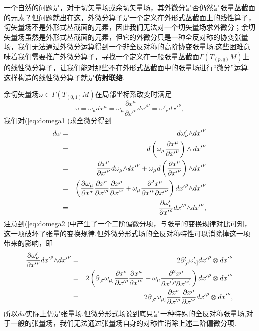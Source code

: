 		一个自然的问题是，对于切矢量场或余切矢量场，其外微分是否仍然是张量丛截面的元素？但问题就出在这，外微分算子是一个定义在外形式丛截面上的线性算子，切矢量场不是外形式丛截面的元素，因此我们无法对一个切矢量场求外微分；余切矢量场虽然是外形式丛截面的元素，但它的外微分只是一种全反对称的协变张量场，我们无法通过外微分运算得到一个非全反对称的高阶协变张量场.这些困难意味着我们需要推广外微分算子，寻找一个定义在一般张量丛截面$\varGamma(T_{(p,q)}M)$上的线性微分算子，让我们能对那些不在外形式丛截面中的张量场进行“微分”运算.这样构造的线性微分算子就是\textbf{仿射联络}.
		\begin{remark}
		余切矢量场$\omega\in \varGamma(T_{(0,1)}M)$在局部坐标系改变时满足
		\begin{equation}\label{eq:domega1}
				\omega=\omega_\mu dx^\mu=\omega_\mu\frac{\partial{x}^\mu}{\partial {x'}^\nu}d{x'}^\nu=\omega'_\nu d{x'}^\nu,
		\end{equation}
		我们对(\ref{eq:domega1})求全微分得到
		\begin{eqnarray}\label{eq:domega2}
			d\omega &=&d\omega'_\nu{\wedge}d{x'}^\nu\notag\\
			&=&d\left(\omega_\mu\frac{\partial{x}^\mu}{{\partial}{x'}^\nu}\right)\wedge d{x'}^\nu\notag\\
			&=&\frac{\partial{x}^\mu}{{\partial}{x'}^\nu}d\omega_\mu{\wedge}d{x'}^\nu+\omega_{\mu}d\left(\frac{\partial{x}^\mu}{\partial {x'}^\nu}\right){\wedge}d{x'}^\nu\notag\\
			&=&\left(\frac{\partial{\omega}_\mu}{{\partial}{x}^\sigma}\frac{\partial{x}^\sigma}{\partial {x'}^\rho}\frac{\partial{x}^\mu}{{\partial}{x'}^\nu}+{\omega}_\mu\frac{\partial^2{x}^\mu}{\partial {x'}^\rho{\partial}{x'}^\nu}\right)d{x'}^\rho{\wedge}d{x'}^\nu\\
			&=&\frac{\partial\omega'_\nu}{{\partial}{x'}^\rho}d{x'}^\rho{\wedge}d{x'}^\nu\notag,
		\end{eqnarray}
		注意到(\ref{eq:domega2})中产生了一个二阶偏微分项，与张量的变换规律对比可知，这一项破坏了张量的变换规律.但外微分形式场的全反对称特性可以消除掉这一项带来的影响，即
		\begin{eqnarray}
			\frac{\partial\omega'_\nu}{{\partial}{x'}^\rho}d{x'}^\rho{\wedge}d{x'}^\nu&=&2\partial'_{[\rho}\omega'_{\nu]}{dx'}^{\rho}\otimes{dx'}^\nu\notag\\
				&=&2\left(\partial_{[\sigma}\omega_{\mu]}\frac{\partial{x}^\sigma}{\partial {x'}^\rho}\frac{\partial{x}^\mu}{{\partial}{x'}^\nu}+{\omega}_\mu\frac{\partial^2{x}^\mu}{\partial {x'}^{[\rho}{\partial}{x'}^{\nu]}}\right){dx'}^{\rho}\otimes{dx'}^\nu\notag\\
			&=&2\partial_{[\sigma}\omega_{\mu]}\frac{\partial{x}^\sigma}{\partial {x'}^\rho}\frac{\partial{x}^\mu}{{\partial}{x'}^\nu}{dx'}^{\rho}\otimes{dx'}^\nu,
		\end{eqnarray}
		所以$d\omega$实际上仍是张量场.但微分形式场说到底只是一种特殊的全反对称张量场,对于一般的张量场，我们无法通过张量场自身的对称性消除上述二阶偏微分项.
		\end{remark}

